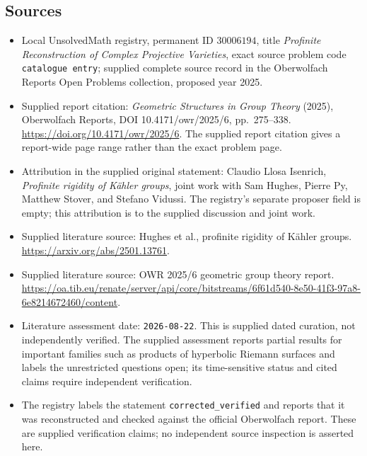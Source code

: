 \documentclass[11pt]{article}
\begin{document}
\subsection{Sources}
\begin{itemize}
\item Local UnsolvedMath registry, permanent ID \(30006194\), title \emph{Profinite Reconstruction of Complex Projective Varieties}, exact source problem code \texttt{catalogue entry}; supplied complete source record in the Oberwolfach Reports Open Problems collection, proposed year 2025.
\item Supplied report citation: \emph{Geometric Structures in Group Theory} (2025), Oberwolfach Reports, DOI 10.4171/owr/2025/6, pp.~275--338. \url{https://doi.org/10.4171/owr/2025/6}. The supplied report citation gives a report-wide page range rather than the exact problem page.
\item Attribution in the supplied original statement: Claudio Llosa Isenrich, \emph{Profinite rigidity of Kähler groups}, joint work with Sam Hughes, Pierre Py, Matthew Stover, and Stefano Vidussi. The registry's separate proposer field is empty; this attribution is to the supplied discussion and joint work.
\item Supplied literature source: Hughes et al., profinite rigidity of Kähler groups. \url{https://arxiv.org/abs/2501.13761}.
\item Supplied literature source: OWR 2025/6 geometric group theory report. \url{https://oa.tib.eu/renate/server/api/core/bitstreams/6f61d540-8e50-41f3-97a8-6e8214672460/content}.
\item Literature assessment date: \texttt{2026-08-22}. This is supplied dated curation, not independently verified. The supplied assessment reports partial results for important families such as products of hyperbolic Riemann surfaces and labels the unrestricted questions open; its time-sensitive status and cited claims require independent verification.
\item The registry labels the statement \texttt{corrected\_verified} and reports that it was reconstructed and checked against the official Oberwolfach report. These are supplied verification claims; no independent source inspection is asserted here.
\end{itemize}
\end{document}
